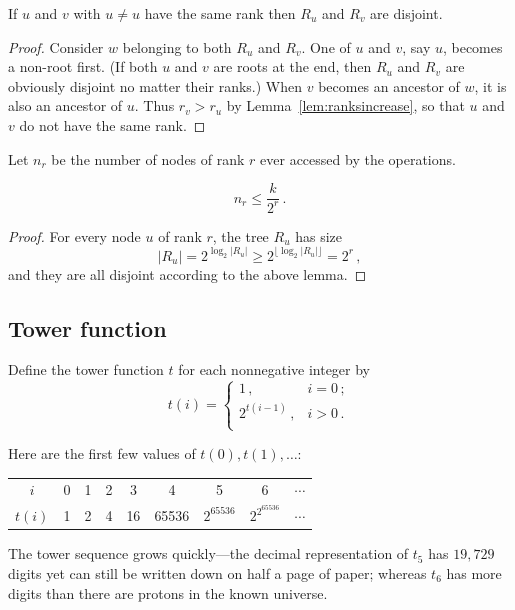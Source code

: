 \documentclass{tstextbook}
\begin{document}
\begin{lemma}
  If $u$ and $v$ with $u\neq u$ have the same rank then $R_u$ and $R_v$ are disjoint.
\end{lemma}
\begin{proof}
  Consider $w$ belonging to both $R_u$ and $R_v$.
  One of $u$ and $v$, say $u$, becomes a non-root first.
  (If both $u$ and $v$ are roots at the end, then $R_u$ and $R_v$ are obviously disjoint no matter their ranks.)
  When $v$ becomes an ancestor of $w$, it is also an ancestor of $u$.
  Thus $r_v>r_u$ by Lemma~\ref{lem:ranksincrease}, so that $u$ and $v$ do not have the same rank.
\end{proof}

Let $n_r$ be the number of nodes of rank $r$ ever accessed by the operations.

\begin{lemma}\label{lem:n_r}
  \[ n_r \leq \frac{k}{2^r}\,.\]
\end{lemma}
\begin{proof}
  For every node $u$ of rank $r$, the tree $R_u$ has size  \[|R_u|= 2^{\log_2|R_u|} \geq 2^{\lfloor \log_2|R_u|\rfloor} = 2^r\,,\] and they are all disjoint according to the above lemma.
\end{proof}

\subsection{Tower function}

\begin{definition}
  Define the tower function $t$ for each nonnegative integer by 
  \[t(i) = \begin{cases}
    1\,,& i =0\,;\\
    2^{t(i-1)}\,,& i >0\,.\\
  \end{cases}
  \]
\end{definition}

Here are the first few values of $t(0), t(1),\ldots$:

\begin{tabular}{ccccccccc}
  $i$ & 0 & 1 & 2 & 3 & 4 & 5& 6 & $\cdots$ \\
  $t(i)$ & 1 & 2 & 4 & 16 & 65536 & $2^{65536}$ & $2^{2^{65536}}$ & $\cdots$
\end{tabular}

The tower sequence grows quickly---the decimal representation of $t_5$ has $19,729$ digits yet can still be written down on half a page of paper; whereas $t_6$ has more digits than there are protons in the known universe.
\end{document}
